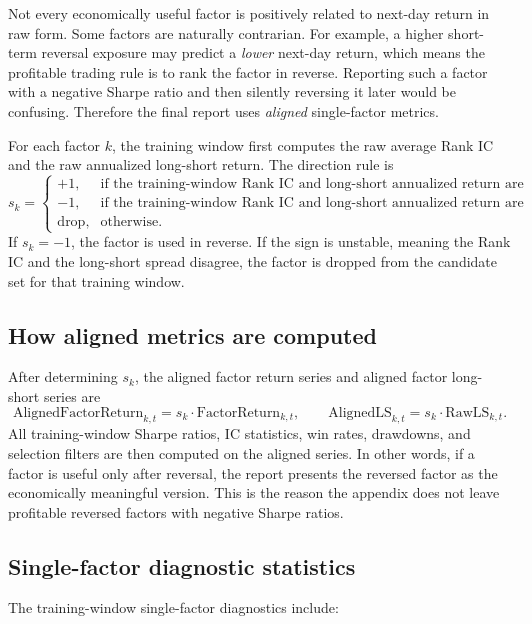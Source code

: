 \documentclass[11pt]{article}
\begin{document}
Not every economically useful factor is positively related to next-day return in raw form. Some factors are naturally contrarian. For example, a higher short-term reversal exposure may predict a \emph{lower} next-day return, which means the profitable trading rule is to rank the factor in reverse. Reporting such a factor with a negative Sharpe ratio and then silently reversing it later would be confusing. Therefore the final report uses \emph{aligned} single-factor metrics.

For each factor \(k\), the training window first computes the raw average Rank IC and the raw annualized long-short return. The direction rule is
\[
s_k=
\begin{cases}
+1, & \text{if the training-window Rank IC and long-short annualized return are both positive,}\\
-1, & \text{if the training-window Rank IC and long-short annualized return are both negative,}\\
\text{drop}, & \text{otherwise.}
\end{cases}
\]
If \(s_k=-1\), the factor is used in reverse. If the sign is unstable, meaning the Rank IC and the long-short spread disagree, the factor is dropped from the candidate set for that training window.

\subsection{How aligned metrics are computed}

After determining \(s_k\), the aligned factor return series and aligned factor long-short series are
\[
\text{AlignedFactorReturn}_{k,t}=s_k \cdot \text{FactorReturn}_{k,t},
\qquad
\text{AlignedLS}_{k,t}=s_k \cdot \text{RawLS}_{k,t}.
\]
All training-window Sharpe ratios, IC statistics, win rates, drawdowns, and selection filters are then computed on the aligned series. In other words, if a factor is useful only after reversal, the report presents the reversed factor as the economically meaningful version. This is the reason the appendix does not leave profitable reversed factors with negative Sharpe ratios.

\subsection{Single-factor diagnostic statistics}

The training-window single-factor diagnostics include:
\end{document}
